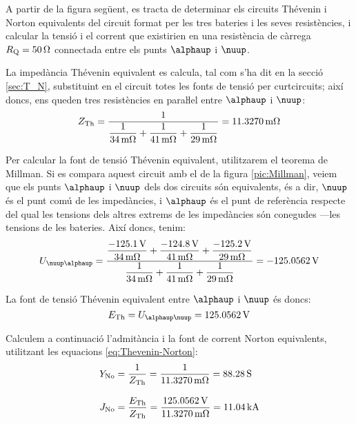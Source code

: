 \begin{exemple}\label{ex:MillmanBateries}
	\addcontentsxms{\MillmanBateries}
    A partir de la figura següent, es tracta de determinar els circuits
    Thévenin i Norton equivalents del circuit format per les tres
    bateries i les seves resistències, i calcular la tensió i el
    corrent que existirien en una resistència de càrrega
    $R_\mathrm{Q}=\qty{50}{\ohm}$ connectada entre els punts $\alphaup$
    i $\nuup$.

    \begin{center}
        
    \end{center}

    La impedància Thévenin equivalent es calcula, tal com s'ha dit en la secció \ref{sec:T_N},
    substituint en el circuit totes les fonts de tensió per curtcircuits; així doncs, ens
    queden tres resistències en paraŀlel entre $\alphaup$ i $\nuup$:
    \[
    Z_\mathrm{Th} = \frac{1}{\dfrac{1}{\qty{34}{\milli\ohm}} +
    \dfrac{1}{\qty{41}{\milli\ohm}} + \dfrac{1}{\qty{29}{\milli\ohm}}} =
    \qty{11,3270}{\milli\ohm}
    \]

    Per calcular la font de tensió Thévenin equivalent, utilitzarem el
    teorema de Millman. Si es compara aquest circuit amb el de la figura
    \vref{pic:Millman}, veiem que els punts $\alphaup$ i $\nuup$ dels dos
    circuits són equivalents, és a dir, $\nuup$ és el punt comú de les
    impedàncies, i $\alphaup$ és el punt de referència respecte del qual les tensions  dels altres extrems de les impedàncies
    són conegudes ---les tensions de les bateries. Així doncs, tenim:
    \[
    U_{\nuup\alphaup} = \frac{\dfrac{\qty{-125,1}{V}}{\qty{34}{m\ohm}} +
    \dfrac{\qty{-124,8}{V}}{\qty{41}{m\ohm}} +
    \dfrac{\qty{-125,2}{V}}{\qty{29}{m\ohm}}}{\dfrac{1}{\qty{34}{m\ohm}}
    + \dfrac{1}{\qty{41}{m\ohm}} + \dfrac{1}{\qty{29}{m\ohm}}} =
    \qty{-125,0562}{V}
    \]

    La font de tensió  Thévenin equivalent entre $\alphaup$ i $\nuup$ és doncs:
    \[
    E\ped{Th} = U_{\alphaup\nuup} = \qty{125,0562}{V}
    \]

    Calculem a continuació l'admitància i la font de corrent  Norton equivalents, utilitzant
    les equacions \eqref{eq:Thevenin-Norton}:
    \begin{align*}
        Y_\mathrm{No} &= \frac{1}{Z_\mathrm{Th}} = \frac{1}{\qty{11,3270}{m\ohm}} = \qty{88,28}{S}
        \\[2ex]
        J_\mathrm{No} &= \frac{E_\mathrm{Th}}{Z_\mathrm{Th}} =
        \frac{\qty{125,0562}{V}}{\qty{11,3270}{m\ohm}}= \qty{11,04}{kA}
    \end{align*}


\end{exemple}
